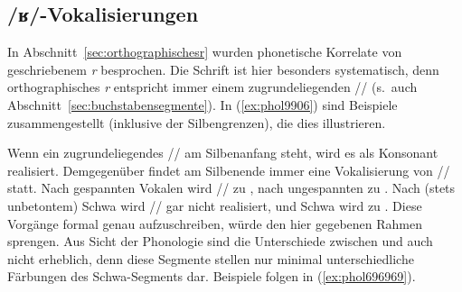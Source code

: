 
\begin{exe}
  \ex\label{ex:phol8011}
  \begin{xlist}
  \end{xlist}
\end{exe}

\subsection{/ʁ/-Vokalisierungen}

\label{sec:rvokalisierungen}

In Abschnitt~\ref{sec:orthographischesr} wurden phonetische Korrelate von geschriebenem \textit{r} besprochen.
Die Schrift ist hier besonders systematisch, denn orthographisches \textit{r} entspricht immer einem zugrundeliegenden // (s.\ auch Abschnitt~\ref{sec:buchstabensegmente}).
In (\ref{ex:phol9906}) sind Beispiele zusammengestellt (inklusive der Silbengrenzen), die dies illustrieren.

\begin{exe}
  \ex\label{ex:phol9906}
  \begin{xlist}
  \end{xlist}
\end{exe}

Wenn ein zugrundeliegendes // am Silbenanfang steht, wird es als Konsonant \textipa{[K]} realisiert.
Demgegenüber findet am Silbenende immer eine Vokalisierung von // statt.
Nach gespannten Vokalen wird // zu \textipa{[5]}, nach ungespannten zu \textipa{[@]}.
Nach (stets unbetontem) Schwa wird // gar nicht realisiert, und Schwa wird zu \textipa{[5]}.
Diese Vorgänge formal genau aufzuschreiben, würde den hier gegebenen Rahmen sprengen.
Aus Sicht der Phonologie sind die Unterschiede zwischen \textipa{[@]} und \textipa{[5]} auch nicht erheblich, denn diese Segmente stellen nur minimal unterschiedliche Färbungen des Schwa-Segments dar.
Beispiele folgen in (\ref{ex:phol696969}).

